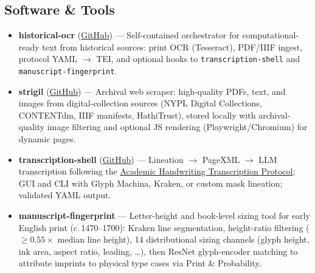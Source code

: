 
\subsection*{Software \& Tools}
\vspace{0.25em}
\begin{itemize}[leftmargin=1.5em, nosep, label=\small\textbullet]
    \item \textbf{historical-ocr}
    (\href{https://github.com/buzzcauldron/historical-ocr}{GitHub}) ---
    Self-contained orchestrator for computational-ready text from historical sources:
    print OCR (Tesseract), PDF/IIIF ingest, protocol YAML $\rightarrow$ TEI, and optional
    hooks to \texttt{transcription-shell} and \texttt{manuscript-fingerprint}.

    \item \textbf{strigil}
    (\href{https://github.com/buzzcauldron/strigil}{GitHub}) ---
    Archival web scraper: high-quality PDFs, text, and images from digital-collection sources
    (NYPL Digital Collections, CONTENTdm, IIIF manifests, HathiTrust), stored locally with
    archival-quality image filtering and optional JS rendering (Playwright/Chromium) for
    dynamic pages.

    \item \textbf{transcription-shell}
    (\href{https://github.com/buzzcauldron/transcription-shell}{GitHub}) ---
    Lineation $\rightarrow$ PageXML $\rightarrow$ LLM transcription following the
    \href{https://github.com/buzzcauldron/transcription-protocol}{Academic Handwriting Transcription Protocol};
    GUI and CLI with Glyph Machina, Kraken, or custom mask lineation; validated YAML output.

    \item \textbf{manuscript-fingerprint} ---
    Letter-height and book-level sizing tool for early English print (c.\,1470--1700):
    Kraken line segmentation, height-ratio filtering ($\geq 0.55\times$ median line height),
    14 distributional sizing channels (glyph height, ink area, aspect ratio, leading, \ldots),
    then ResNet glyph-encoder matching to attribute imprints to physical type cases via
    Print \& Probability.


\end{itemize}
